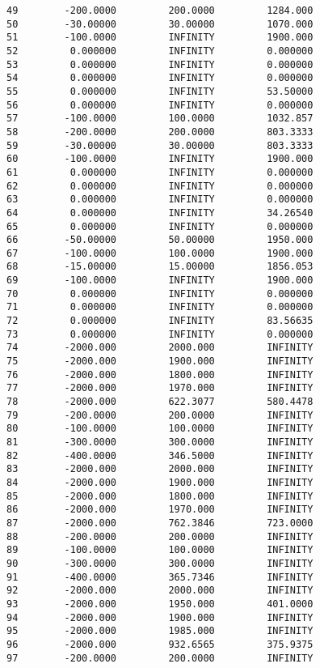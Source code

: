 \documentclass[12pt]{article}
\begin{document}
\begin{appendices}
\begin{lstlisting}
49        -200.0000         200.0000         1284.000
50        -30.00000         30.00000         1070.000
51        -100.0000         INFINITY         1900.000
52         0.000000         INFINITY         0.000000
53         0.000000         INFINITY         0.000000
54         0.000000         INFINITY         0.000000
55         0.000000         INFINITY         53.50000
56         0.000000         INFINITY         0.000000
57        -100.0000         100.0000         1032.857
58        -200.0000         200.0000         803.3333
59        -30.00000         30.00000         803.3333
60        -100.0000         INFINITY         1900.000
61         0.000000         INFINITY         0.000000
62         0.000000         INFINITY         0.000000
63         0.000000         INFINITY         0.000000
64         0.000000         INFINITY         34.26540
65         0.000000         INFINITY         0.000000
66        -50.00000         50.00000         1950.000
67        -100.0000         100.0000         1900.000
68        -15.00000         15.00000         1856.053
69        -100.0000         INFINITY         1900.000
70         0.000000         INFINITY         0.000000
71         0.000000         INFINITY         0.000000
72         0.000000         INFINITY         83.56635
73         0.000000         INFINITY         0.000000
74        -2000.000         2000.000         INFINITY
75        -2000.000         1900.000         INFINITY
76        -2000.000         1800.000         INFINITY
77        -2000.000         1970.000         INFINITY
78        -2000.000         622.3077         580.4478
79        -200.0000         200.0000         INFINITY
80        -100.0000         100.0000         INFINITY
81        -300.0000         300.0000         INFINITY
82        -400.0000         346.5000         INFINITY
83        -2000.000         2000.000         INFINITY
84        -2000.000         1900.000         INFINITY
85        -2000.000         1800.000         INFINITY
86        -2000.000         1970.000         INFINITY
87        -2000.000         762.3846         723.0000
88        -200.0000         200.0000         INFINITY
89        -100.0000         100.0000         INFINITY
90        -300.0000         300.0000         INFINITY
91        -400.0000         365.7346         INFINITY
92        -2000.000         2000.000         INFINITY
93        -2000.000         1950.000         401.0000
94        -2000.000         1900.000         INFINITY
95        -2000.000         1985.000         INFINITY
96        -2000.000         932.6565         375.9375
97        -200.0000         200.0000         INFINITY

\end{lstlisting}
\end{appendices}
\end{document}
